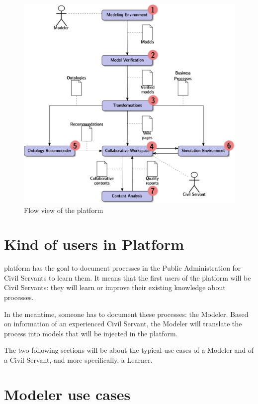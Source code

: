 \documentclass{learnpad}
\begin{document}
\begin{figure}[!htp]
	\centering
	\includegraphics[width=.6\paperwidth,keepaspectratio]{figures/logical-view.png}
	\caption{Flow view of the \learnpad platform}
	\label{fig:flow-view}
\end{figure}

\section{Kind of users in \learnpad Platform}
\learnpad platform has the goal to document processes in the Public
Administration for Civil Servants to learn them.  It means that the first users
of the platform will be Civil Servants: they will learn or improve their
existing knowledge about processes.

In the meantime, someone has to document these processes: the Modeler.  Based on
information of an experienced Civil Servant, the Modeler will translate the
process into models that will be injected in the \learnpad platform.

The two following sections will be about the typical use cases of a Modeler and
of a Civil Servant, and more specifically, a Learner.

\section{Modeler use cases}
\end{document}

